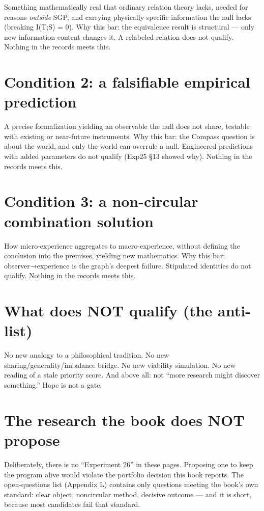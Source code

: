 \documentclass[
  11pt,
]{book}
\begin{document}
Something mathematically real that ordinary relation theory lacks,
needed for reasons \emph{outside} SGP, and carrying physically specific
information the null lacks (breaking I(T;S) = 0). Why this bar: the
equivalence result is structural --- only new information-content
changes it. A relabeled relation does not qualify. Nothing in the
records meets this.

\section{Condition 2: a falsifiable empirical
prediction}\label{condition-2-a-falsifiable-empirical-prediction}

A precise formalization yielding an observable the null does not share,
testable with existing or near-future instruments. Why this bar: the
Compass question is about the world, and only the world can overrule a
null. Engineered predictions with added parameters do not qualify (Exp25
§13 showed why). Nothing in the records meets this.

\section{Condition 3: a non-circular combination
solution}\label{condition-3-a-non-circular-combination-solution}

How micro-experience aggregates to macro-experience, without defining
the conclusion into the premises, yielding new mathematics. Why this
bar: observer→experience is the graph's deepest failure. Stipulated
identities do not qualify. Nothing in the records meets this.

\section{What does NOT qualify (the
anti-list)}\label{what-does-not-qualify-the-anti-list}

No new analogy to a philosophical tradition. No new
sharing/generality/imbalance bridge. No new viability simulation. No new
reading of a stale priority score. And above all: not ``more research
might discover something.'' Hope is not a gate.

\section{The research the book does NOT
propose}\label{the-research-the-book-does-not-propose}

Deliberately, there is no ``Experiment 26'' in these pages. Proposing
one to keep the program alive would violate the portfolio decision this
book reports. The open-questions list (Appendix L) contains only
questions meeting the book's own standard: clear object, noncircular
method, decisive outcome --- and it is short, because most candidates
fail that standard.
\end{document}
